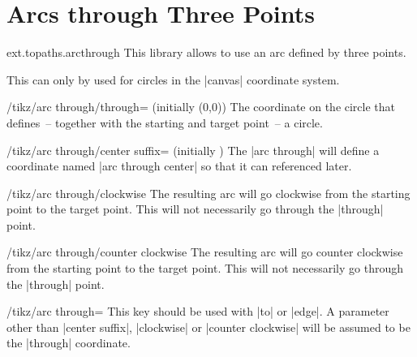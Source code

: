 %
%
%

\section{Arcs through Three Points}
\label{library:topaths.arcthrough}
\begin{tikzlibrary}{ext.topaths.arcthrough}
  This library allows to use an arc defined by three points.
\end{tikzlibrary}

\begin{codeexample}[width=10cm,preamble=\usetikzlibrary{ext.topaths.arcthrough}]
\end{codeexample}

This can only by used for circles in the |canvas| coordinate system.

\begin{key}{/tikz/arc through/through= (initially {(0,0)})}
  The coordinate on the circle that defines~-- together with the
  starting and target point~-- a circle.
\end{key}

\begin{key}{/tikz/arc through/center suffix= (initially {})}
  The |arc through| will define a coordinate named |arc through center|
  so that it can referenced later.
\end{key}

\begin{key}{/tikz/arc through/clockwise}
  The resulting arc will go clockwise from the starting point to the target point.
  This will not necessarily go through the |through| point.
\end{key}

\begin{key}{/tikz/arc through/counter clockwise}
  The resulting arc will go counter clockwise from the starting point to the target point.
  This will not necessarily go through the |through| point.
\end{key}

\begin{key}{/tikz/arc through=}
  This key should be used with |to| or |edge|.
  A parameter other than |center suffix|, |clockwise| or |counter clockwise| will
  be assumed to be the |through| coordinate.
\end{key}
